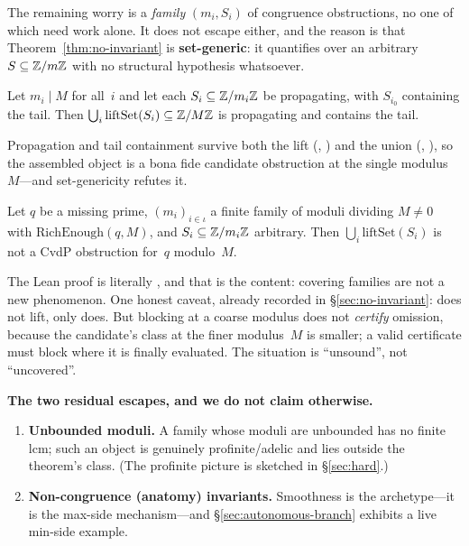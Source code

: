 The remaining worry is a \emph{family} $(m_i, S_i)$ of congruence
obstructions, no one of which need work alone.  It does not escape
either, and the reason is that Theorem~\ref{thm:no-invariant} is
\textbf{set-generic}: it quantifies over an arbitrary
$S \subseteq \mathbb{Z}/m\mathbb{Z}$ with no structural hypothesis whatsoever.

\begin{lemma}
\label{lem:covering-assembles}
Let $m_i \mid M$ for all~$i$ and let each $S_i \subseteq \mathbb{Z}/m_i\mathbb{Z}$
be propagating, with $S_{i_0}$ containing the tail.  Then
$\bigcup_i \mathrm{liftSet}(S_i) \subseteq \mathbb{Z}/M\mathbb{Z}$ is propagating and
contains the tail.
\end{lemma}

\noindent
Propagation and tail containment survive both the lift
(,
) and the union
(,
), so the
assembled object is a bona fide candidate obstruction at the single
modulus~$M$---and set-genericity refutes it.

\begin{theorem}
\label{thm:no-covering-family}
Let $q$ be a missing prime, $(m_i)_{i \in \iota}$ a finite family of
moduli dividing $M \neq 0$ with $\mathrm{RichEnough}(q,M)$, and
$S_i \subseteq \mathbb{Z}/m_i\mathbb{Z}$ arbitrary.  Then
$\bigcup_i \mathrm{liftSet}(S_i)$ is not a CvdP obstruction for~$q$
modulo~$M$.
\end{theorem}

\noindent
The Lean proof is literally
, and that is the content:
covering families are not a new phenomenon.  One honest caveat, already
recorded in \S\ref{sec:no-invariant}:  does not lift, only
 does.  But blocking at a coarse modulus does not
\emph{certify} omission, because the candidate's class at the finer
modulus~$M$ is smaller; a valid certificate must block where it is
finally evaluated.  The situation is ``unsound'', not ``uncovered''.

\begin{frontierbox}
\textbf{The two residual escapes, and we do not claim otherwise.}
\begin{enumerate}[nosep,leftmargin=*]
\item \textbf{Unbounded moduli.}  A family whose moduli are unbounded
  has no finite lcm; such an object is genuinely profinite/adelic and
  lies outside the theorem's class.  (The profinite picture is
  sketched in \S\ref{sec:hard}.)
\item \textbf{Non-congruence (anatomy) invariants.}  Smoothness is the
  archetype---it is the max-side mechanism---and
  \S\ref{sec:autonomous-branch} exhibits a live min-side example.
\end{enumerate}
\end{frontierbox}

